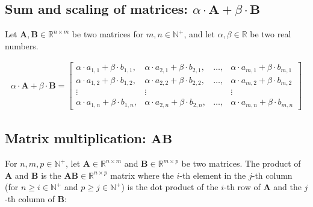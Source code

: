 \documentclass[titlepage]{article}
\begin{document}
      \subsection{%
        Sum and scaling of matrices:
        $\alpha \cdot \mathbf{A} + \beta \cdot \mathbf{B}$
      }

        Let $\mathbf{A}, \mathbf{B} \in \mathbb{R}^{n \times m}$ be two matrices
        for $m, n \in \mathbb{N}^+$, and let $\alpha, \beta \in \mathbb{R}$ be
        two real numbers.

        \begin{align*}
          \alpha \cdot \mathbf{A} + \beta \cdot \mathbf{B}
            = \begin{bmatrix}
                \alpha \cdot a_{1,1} + \beta \cdot b_{1,1},
                  & \alpha \cdot a_{2,1} + \beta \cdot b_{2,1},
                  & \ldots,
                  & \alpha \cdot a_{m,1} + \beta \cdot b_{m,1} \\
                \alpha \cdot a_{1,2} + \beta \cdot b_{1,2},
                  & \alpha \cdot a_{2,2} + \beta \cdot b_{2,2},
                  & \ldots,
                  & \alpha \cdot a_{m,2} + \beta \cdot b_{m,2} \\
                \vdots & \vdots & & \vdots \\
                \alpha \cdot a_{1,n} + \beta \cdot b_{1,n},
                  & \alpha \cdot a_{2,n} + \beta \cdot b_{2,n},
                  & \ldots,
                  & \alpha \cdot a_{m,n} + \beta \cdot b_{m,n}
              \end{bmatrix}
        \end{align*}

      \subsection{Matrix multiplication: $\mathbf{AB}$}

        For $n, m, p \in \mathbb{N}^+$, let
        $\mathbf{A} \in \mathbb{R}^{n \times m}$ and
        $\mathbf{B} \in \mathbb{R}^{m \times p}$ be two matrices.
        The product of $\mathbf{A}$ and $\mathbf{B}$ is the
        $\mathbf{AB} \in \mathbb{R}^{n \times p}$ matrix where the $i$-th
        element in the $j$-th column (for $n \geq i \in \mathbb{N}^+$ and
        $p \geq j \in \mathbb{N}^+$) is the dot product of the $i$-th row
        of $\mathbf{A}$ and the $j$-th column of $\mathbf{B}$:
\end{document}
